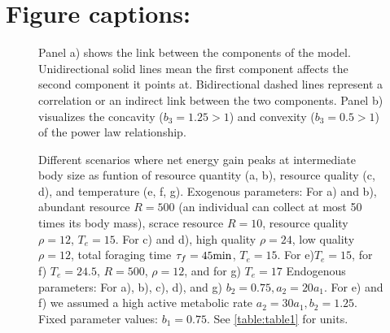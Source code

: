 \section*{Figure captions:}
\begin{figure}[H]
\begin{center}
\caption{
	Panel a) shows the link between the components of the model.
	Unidirectional solid lines mean the first component affects the second component it points at.
	Bidirectional dashed lines represent a correlation or an indirect link between the two components.
	Panel b) visualizes the concavity ($b_3  = 1.25 > 1$) and convexity ($b_3 = 0.5 > 1$) of the power law relationship.
}
\label{fig1}
\end{center}
\end{figure}
%
\begin{figure}[H]
\begin{center}
\caption{
	Different scenarios where net energy gain peaks at intermediate body size as funtion of resource quantity (a, b), resource quality (c, d), and temperature (e, f, g).
	Exogenous parameters:
	For a) and b), abundant resource $R = 500$ (an individual can collect at most 50 times its body mass), scrace resource $R= 10$, resource quality $\rho = 12$, $T_e = 15$.
	For c) and d), high quality $\rho = 24$, low quality $\rho = 12$, total foraging time $\tau_f = 45 \rm{min}$, $T_e = 15$.
	For e)$T_e = 15$, for f) $T_e = 24.5$, $R = 500$, $\rho = 12$, and for g) $T_e = 17$
	Endogenous parameters:
	For a), b), c), d), and g) $b_2 = 0.75, a_2 = 20 a_1$.
	For e) and f) we assumed a high active metabolic rate $a_2 = 30 a_1, b_2  = 1.25$.
	Fixed parameter values: $b_1 = 0.75$.
	See \cref{table:table1} for units.
}
\label{fig2}
\end{center}
\end{figure}

